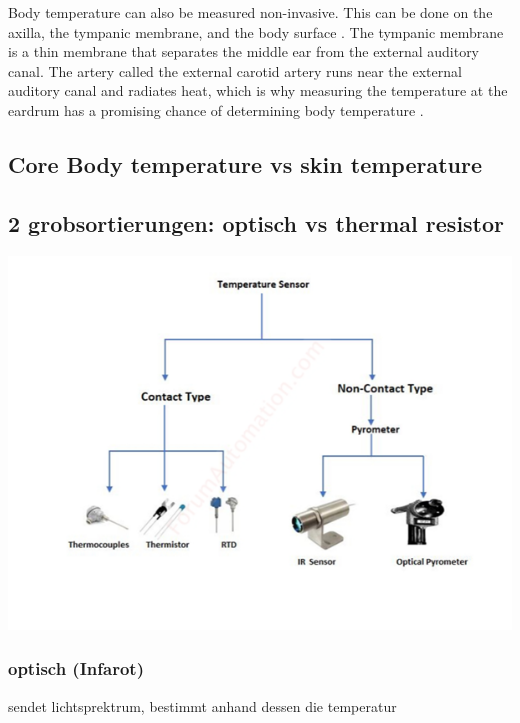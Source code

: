 Body temperature can also be measured non-invasive.
This can be done on the axilla, the tympanic membrane, and the body surface \cite{moranCoreTemperatureMeasurement2002a}.
The tympanic membrane is a thin membrane that separates the middle ear from the external auditory canal. 
The artery called the external carotid artery runs near the external auditory canal and radiates heat, which is why measuring the temperature at the eardrum has a promising chance of determining body temperature \cite{yeohRevisitingTympanicMembrane2017}.



\subsection{Core Body temperature vs skin temperature}

\subsection{2 grobsortierungen: optisch vs thermal resistor}
\includegraphics[scale=0.7]{thesis-doc/images/introduction/temp_sensor_types.png}
\subsubsection{optisch (Infarot)}
sendet lichtsprektrum, bestimmt anhand dessen die temperatur

